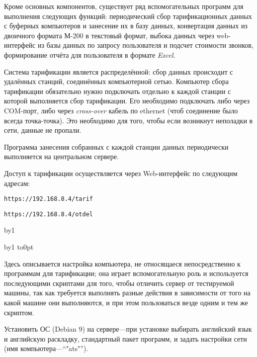 \noindent
Кроме основных компонентов, существует ряд вспомогательных программ для выполнения следующих функций: периодический сбор тарификационных данных с буферных компьютеров и занесение их в базу данных, конвертация данных из двоичного формата М-200 в текстовый формат, выбока данных через web-интерфейс из базы данных по запросу пользователя и подсчет стоимости звонков, формирование отчёта для пользователя в формате {\it Excel}.

\noindent
Система тарификации является распределённой: сбор данных происходит с удалённых станций, соединённых компьютерной сетью.
Компьютер сбора тарификации обязательно нужно подключать отдельно к каждой станции с которой выполняется сбор тарификации. Его необходимо подключать либо через COM-порт, либо через {\sl cross-over} кабель по ethernet (чтоб соединение было всегда точка-точка). Это необходимо для того, чтобы если возникнут неполадки в сети, данные не пропали.

\noindent
Программа занесения собранных с каждой станции данных периодически выполняется на центральном сервере.

\noindent
Доступ к тарификации осуществляется через Web-интерфейс по следующим адресам:
\item{} {\tt https://192.168.8.4/tarif} 
\item{} {\tt https://192.168.8.4/otdel} 

\vfill
\eject
\removelastskip\bigskip\medskip
\advance\secnum by1 
\noindent\rectangle{16pt}{9pt}{25pt}{\bbbf\the\secnum}%
\par
\nobreak\medskip

\removelastskip\bigskip
\advance\subsecnum by1
\noindent\vbox to0pt{\vss
  \kern-5pt}%
\par
\nobreak\smallskip
\medskip

Здесь описывается настройка компьютера, не относящаеся непосредственно к программам для тарификации; она играет вспомогательную
роль и используется последующими скриптами для того, чтобы отличить сервер от тестируемой машины, так как требуется выполнять
разные действия в зависимости от того на какой машине они выполняются, и при этом пользоваться везде одним и тем же скриптом.
\smallskip

\N
Установить ОС (Debian 9) на сервере---при установке выбирать английский язык и английскую
раскладку,
стандартный пакет программ, и задать настройки сети (имя компьютера---``"ats"'').

